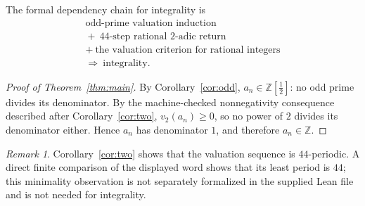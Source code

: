\documentclass[11pt]{article}
\theoremstyle{remark}
\newtheorem*{remark}{Remark}
\newcommand{\Z}{\mathbb{Z}}
\newcommand{\vt}{v_2}
\begin{document}
The formal dependency chain for integrality is
\[
\begin{gathered}
\text{odd-prime valuation induction}\\
{}+\ \text{$44$-step rational $2$-adic return}\\
{}+\ \text{the valuation criterion for rational integers}\\[2pt]
\Longrightarrow\ \text{integrality}.
\end{gathered}
\]
\begin{proof}[Proof of Theorem~\ref{thm:main}]
By Corollary~\ref{cor:odd}, $a_n\in\Z[\tfrac12]$: no odd prime divides its
denominator.  By the machine-checked nonnegativity consequence described after
Corollary~\ref{cor:two}, $\vt(a_n)\ge0$, so no power of $2$ divides its
denominator either.  Hence $a_n$ has denominator $1$, and therefore
$a_n\in\Z$.
\end{proof}

\begin{remark}
Corollary~\ref{cor:two} shows that the valuation sequence is $44$-periodic.
A direct finite comparison of the displayed word shows that its least period is
$44$; this minimality observation is not separately formalized in the supplied
Lean file and is not needed for integrality.
\end{remark}
\end{document}
